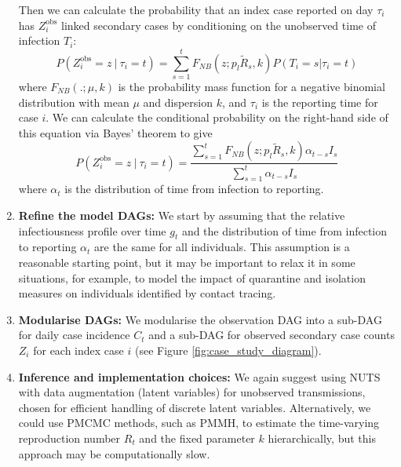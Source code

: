 \documentclass{article}
\begin{document}
\begin{enumerate}
   Then we can calculate the probability that an index case reported on day $\tau_i$ has $Z^\mathrm{obs}_i$ linked secondary cases by conditioning on the unobserved time of infection $T_i$:
   \begin{equation}
       P(Z^\mathrm{obs}_i=z \ | \ \tau_i=t) = \sum_{s=1}^{t} F_{NB}(z; p_l\tilde{R}_s,k) P(T_i=s | \tau_i=t)
   \end{equation}
where $F_{NB}(.;\mu,k)$ is the probability mass function for a negative binomial distribution with mean $\mu$ and dispersion $k$, and $\tau_i$ is the reporting time for case $i$.  We can calculate the conditional probability on the right-hand side of this equation via Bayes' theorem to give
   \begin{equation} \label{eq:Zobs}
       P(Z^\mathrm{obs}_i=z \ | \ \tau_i=t) = \frac{\sum_{s=1}^{t} F_{NB}(z; p_l\tilde{R}_s,k) \alpha_{t-s} I_s}{\sum_{s=1}^{t}\alpha_{t-s} I_s}  
   \end{equation}
 where $\alpha_t$ is the distribution of time from infection to reporting.

    \item \textbf{Refine the model DAGs:}  We start by assuming that the relative infectiousness profile over time $g_t$ and the distribution of time from infection to reporting $\alpha_t$ are the same for all individuals. This assumption is a reasonable starting point, but it may be important to relax it in some situations, for example, to model the impact of quarantine and isolation measures on individuals identified by contact tracing.

    \item \textbf{Modularise DAGs:} We modularise the observation \ac{DAG} into a sub-DAG for daily case incidence $C_t$ and a sub-DAG for observed secondary case counts $Z_i$ for each index case $i$ (see Figure \ref{fig:case_study_diagram}).  
    
    \item \textbf{Inference and implementation choices:} We again suggest using \ac{NUTS} with data augmentation (latent variables) for unobserved transmissions, chosen for efficient handling of discrete latent variables. Alternatively, we could use \ac{PMCMC} methods, such as \ac{PMMH}, to estimate the time-varying reproduction number $R_t$ and the fixed parameter $k$ hierarchically, but this approach may be computationally slow. 


\end{enumerate}
\end{document}

